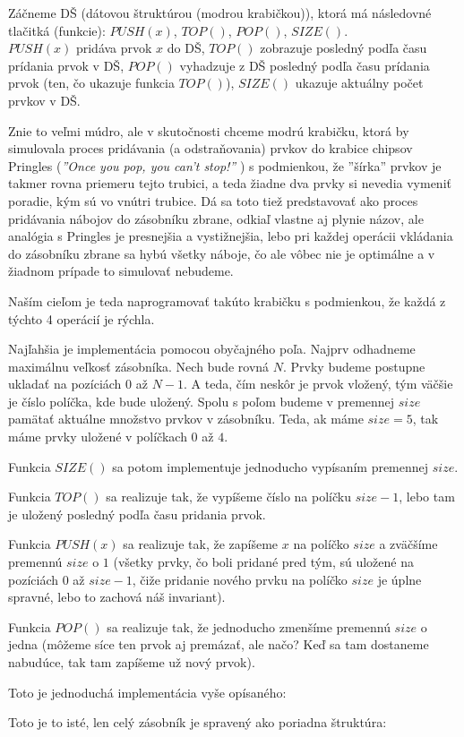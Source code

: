 Záčneme DŠ (dátovou štruktúrou (modrou krabičkou)), ktorá má následovné tlačitká 
(funkcie): 
$PUSH(x)$, $TOP()$, $POP()$, $SIZE()$. \\
$PUSH(x)$ pridáva prvok $x$ do DŠ, $TOP()$ zobrazuje posledný podľa času 
prídania prvok v DŠ, $POP()$ vyhadzuje z DŠ posledný podľa času prídania prvok 
(ten, čo ukazuje funkcia $TOP()$), $SIZE()$ ukazuje aktuálny počet prvkov v DŠ.

Znie to veľmi múdro, ale v skutočnosti chceme modrú krabičku, ktorá by simulovala 
proces pridávania (a odstraňovania) prvkov do krabice chipsov Pringles (\textit{''Once 
you pop, you can't stop!''} ) s podmienkou, že ''šírka'' prvkov je takmer
rovna priemeru tejto trubici, a teda žiadne dva prvky si nevedia vymeniť poradie, 
kým sú vo vnútri trubice. Dá sa toto tiež predstavovať ako proces pridávania 
nábojov do zásobníku zbrane, odkiaľ vlastne aj plynie názov, ale analógia s Pringles
je presnejšia a vystižnejšia, lebo pri každej operácii vkládania do zásobníku zbrane sa 
hybú všetky náboje, čo ale vôbec nie je optimálne a v žiadnom prípade to simulovať nebudeme. 

Naším cieľom je teda naprogramovať takúto krabičku s podmienkou, že každá z 
týchto 4 operácií je rýchla. 

\medskip

Najľahšia je implementácia pomocou obyčajného poľa. Najprv odhadneme maximálnu veľkosť 
zásobníka. Nech bude rovná $N$. Prvky budeme postupne ukladať na pozíciách $0$ až $N-1$. 
A teda, čím neskôr je prvok vložený, tým väčšie je číslo políčka, kde bude uložený.
Spolu s poľom budeme v premennej $size$ pamätať aktuálne množstvo prvkov v zásobníku.
Teda, ak máme $size = 5$, tak máme prvky uložené v políčkach $0$ až $4$.
   
Funkcia $SIZE()$ sa potom implementuje jednoducho vypísaním premennej $size$.

Funkcia $TOP()$ sa realizuje tak, že vypíšeme číslo na políčku $size-1$, 
lebo tam je uložený posledný podľa času pridania prvok.

Funkcia $PUSH(x)$ sa realizuje tak, že zapíšeme $x$ na políčko $size$ a zväčšíme premennú $size$ 
o $1$ (všetky prvky, čo boli pridané pred tým, sú uložené na pozíciách $0$ až 
$size-1$, čiže pridanie nového prvku na políčko $size$ je úplne spravné, lebo 
to zachová náš invariant). 

Funkcia $POP()$ sa realizuje tak, že jednoducho zmenšíme 
premennú $size$ o jedna (môžeme síce ten prvok aj premázať, ale načo? Keď sa 
tam dostaneme nabudúce, tak tam zapíšeme už nový prvok).

Toto je jednoduchá implementácia vyše opísaného:

Toto je to isté, len celý zásobník je spravený ako poriadna štruktúra:


